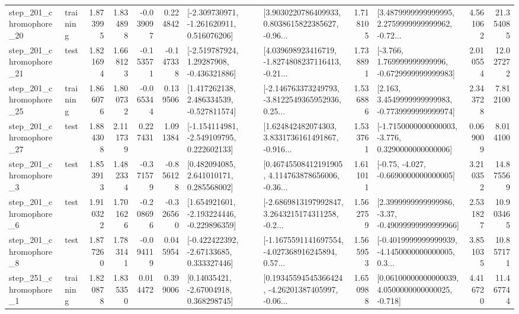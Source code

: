 \begin{tabular}{llrrrrllrlrr}
  step\_201\_chromophore\_20 &  training &      1.873995 &    1.834898 &     -0.039097 &  0.224842 &   [-2.309730971, -1.261620911, 0.516076206] &  [3.9030220786409933, 0.8038615822385627, -0.96... &       1.718105 &  [3.4879999999999995, 2.2759999999999962, -0.72... &            4.561062 &         21.354085 \\
  step\_201\_chromophore\_21 &      test &      1.821694 &    1.668123 &     -0.153571 & -0.147338 &    [-2.519787924, 1.29287908, -0.436321886] &  [4.039698923416719, -1.8274808237116413, -0.21... &       1.738891 &   [-3.766, 1.769999999999996, -0.6729999999999983] &            2.010554 &         12.027272 \\
  step\_201\_chromophore\_25 &  training &      1.866076 &    1.800732 &     -0.065344 &  0.139506 &    [1.417262138, 2.486334539, -0.527811574] &  [-2.146763373249793, -3.8122549365952936, 0.25... &       1.536886 &   [2.163, 3.4549999999999983, -0.7739999999999974] &            2.343728 &          7.812100 \\
  step\_201\_chromophore\_27 &      test &      1.884308 &    2.111739 &      0.227431 &  1.091384 &   [-1.154114981, -2.549109795, 0.222602133] &  [1.624842482074303, 3.8331736161491867, -0.916... &       1.533761 &  [-1.7150000000000003, -3.776, 0.3290000000000006] &            0.069009 &          8.014100 \\
   step\_201\_chromophore\_3 &      test &      1.853913 &    1.482334 &     -0.371579 & -0.856128 &     [0.482094085, 2.641010171, 0.285568002] &  [0.46745508412191905, 4.114763878656006, -0.36... &       1.611011 &               [-0.75, -4.027, -0.6690000000000005] &            3.210352 &         14.875569 \\
   step\_201\_chromophore\_6 &      test &      1.910322 &    1.701626 &     -0.208696 & -0.326560 &   [1.654921601, -2.193224446, -0.229896359] &  [-2.6869813197992847, 3.2643215174311258, -0.2... &       1.562759 &  [2.3999999999999986, -3.37, -0.49099999999999966] &            2.531827 &         10.903465 \\
   step\_201\_chromophore\_8 &      test &      1.877260 &    1.783141 &     -0.094119 &  0.045954 &    [-0.422422392, -2.67133685, 0.333327446] &  [-1.1675591141697554, -4.027368916245894, 0.57... &       1.565953 &  [-0.4019999999999939, -4.1450000000000005, 0.3... &            3.851035 &         10.857171 \\
   step\_251\_chromophore\_1 &  training &      1.820878 &    1.835350 &      0.014472 &  0.399006 &      [0.14035421, -2.67004918, 0.368298745] &  [0.19345594545366424, -4.26201387405997, -0.06... &       1.650988 &  [0.06100000000000039, 4.0500000000000025, -0.718] &            4.416720 &         11.467744 \\

\end{tabular}
